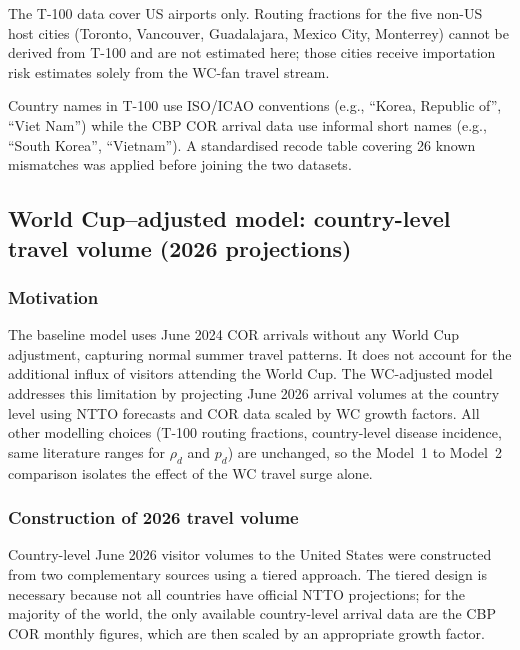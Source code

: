 \documentclass[12pt]{article}
\begin{document}
The T-100 data cover US airports only. Routing fractions for the five
non-US host cities (Toronto, Vancouver, Guadalajara, Mexico City,
Monterrey) cannot be derived from T-100 and are not estimated here;
those cities receive importation risk estimates solely from the
WC-fan travel stream.

Country names in T-100 use ISO/ICAO conventions (e.g.,
``Korea, Republic of'', ``Viet Nam'') while the CBP COR arrival data
use informal short names (e.g., ``South Korea'', ``Vietnam''). A
standardised recode table covering 26 known mismatches was applied
before joining the two datasets.

\subsection*{World Cup--adjusted model: country-level travel
volume (2026 projections)}

\subsubsection*{Motivation}

The baseline model uses June 2024 COR arrivals without any World
Cup adjustment, capturing normal summer travel patterns. It does not
account for the additional influx of visitors attending the World Cup.
The WC-adjusted model addresses this limitation by projecting June
2026 arrival volumes at the country level using NTTO forecasts and
COR data scaled by WC growth factors. All other modelling choices
(T-100 routing fractions, country-level disease incidence, same
literature ranges for $\rho_d$ and $p_d$) are unchanged, so the Model~1 to Model~2
comparison isolates the effect of the WC travel surge alone.

\subsubsection*{Construction of 2026 travel volume}

Country-level June 2026 visitor volumes to the United States were
constructed from two complementary sources using a tiered approach.
The tiered design is necessary because not all countries have
official NTTO projections; for the majority of the world, the only
available country-level arrival data are the CBP COR monthly figures,
which are then scaled by an appropriate growth factor.
\end{document}
